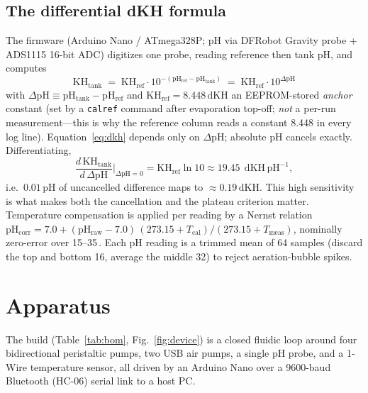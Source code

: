 \documentclass[11pt]{article}
\newcommand{\dpH}{\ensuremath{\Delta\mathrm{pH}}}
\newcommand{\dkh}{\ensuremath{\,\mathrm{dKH}}}
\begin{document}
\subsection{The differential dKH formula}
The firmware (Arduino Nano / ATmega328P; pH via DFRobot Gravity probe + ADS1115
16-bit ADC) digitizes one probe, reading reference then tank pH, and computes
\begin{equation}
\boxed{\;\mathrm{KH_{tank}} \;=\; \mathrm{KH_{ref}}\cdot 10^{-(\mathrm{pH_{ref}}-\mathrm{pH_{tank}})}
\;=\; \mathrm{KH_{ref}}\cdot 10^{\dpH}\;}
\label{eq:dkh}
\end{equation}
with $\dpH \equiv \mathrm{pH_{tank}}-\mathrm{pH_{ref}}$ and
$\mathrm{KH_{ref}}=8.448\dkh$ an EEPROM-stored \emph{anchor} constant (set by a
\texttt{calref} command after evaporation top-off; \emph{not} a per-run
measurement---this is why the reference column reads a constant 8.448 in every
log line). Equation~\eqref{eq:dkh} depends only on \dpH{}; absolute pH cancels
exactly. Differentiating,
\begin{equation}
\frac{d\,\mathrm{KH_{tank}}}{d\,\dpH}\bigg|_{\dpH=0}
= \mathrm{KH_{ref}}\ln 10 \approx 19.45\;\dkh\,\mathrm{pH^{-1}},
\label{eq:sens}
\end{equation}
i.e.\ $0.01$\,pH of uncancelled difference maps to $\approx0.19\dkh$. This high
sensitivity is what makes both the cancellation and the plateau criterion
matter. Temperature compensation is applied per reading by a Nernst relation
$\mathrm{pH_{corr}}=7.0+(\mathrm{pH_{raw}}-7.0)\,(273.15+T_\mathrm{cal})/(273.15+T_\mathrm{meas})$,
nominally zero-error over 15--35\,\textcelsius. Each pH reading is a trimmed
mean of 64 samples (discard the top and bottom 16, average the middle 32) to
reject aeration-bubble spikes.

\section{Apparatus}\label{sec:apparatus}
The build (Table~\ref{tab:bom}, Fig.~\ref{fig:device}) is a closed fluidic loop
around four bidirectional peristaltic pumps, two USB air pumps, a single pH
probe, and a 1-Wire temperature sensor, all driven by an Arduino Nano over a
9600-baud Bluetooth (HC-06) serial link to a host PC.
\end{document}
